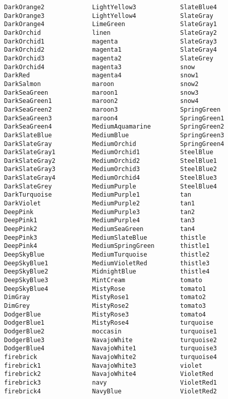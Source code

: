 \documentclass{book}
\begin{document}
\begin{verbatim}
DarkOrange2             LightYellow3            SlateBlue4
DarkOrange3             LightYellow4            SlateGray
DarkOrange4             LimeGreen               SlateGray1
DarkOrchid              linen                   SlateGray2
DarkOrchid1             magenta                 SlateGray3
DarkOrchid2             magenta1                SlateGray4
DarkOrchid3             magenta2                SlateGrey
DarkOrchid4             magenta3                snow
DarkRed                 magenta4                snow1
DarkSalmon              maroon                  snow2
DarkSeaGreen            maroon1                 snow3
DarkSeaGreen1           maroon2                 snow4
DarkSeaGreen2           maroon3                 SpringGreen
DarkSeaGreen3           maroon4                 SpringGreen1
DarkSeaGreen4           MediumAquamarine        SpringGreen2
DarkSlateBlue           MediumBlue              SpringGreen3
DarkSlateGray           MediumOrchid            SpringGreen4
DarkSlateGray1          MediumOrchid1           SteelBlue
DarkSlateGray2          MediumOrchid2           SteelBlue1
DarkSlateGray3          MediumOrchid3           SteelBlue2
DarkSlateGray4          MediumOrchid4           SteelBlue3
DarkSlateGrey           MediumPurple            SteelBlue4
DarkTurquoise           MediumPurple1           tan
DarkViolet              MediumPurple2           tan1
DeepPink                MediumPurple3           tan2
DeepPink1               MediumPurple4           tan3
DeepPink2               MediumSeaGreen          tan4
DeepPink3               MediumSlateBlue         thistle
DeepPink4               MediumSpringGreen       thistle1
DeepSkyBlue             MediumTurquoise         thistle2
DeepSkyBlue1            MediumVioletRed         thistle3
DeepSkyBlue2            MidnightBlue            thistle4
DeepSkyBlue3            MintCream               tomato
DeepSkyBlue4            MistyRose               tomato1
DimGray                 MistyRose1              tomato2
DimGrey                 MistyRose2              tomato3
DodgerBlue              MistyRose3              tomato4
DodgerBlue1             MistyRose4              turquoise
DodgerBlue2             moccasin                turquoise1
DodgerBlue3             NavajoWhite             turquoise2
DodgerBlue4             NavajoWhite1            turquoise3
firebrick               NavajoWhite2            turquoise4
firebrick1              NavajoWhite3            violet
firebrick2              NavajoWhite4            VioletRed
firebrick3              navy                    VioletRed1
firebrick4              NavyBlue                VioletRed2

\end{verbatim}
\end{document}
